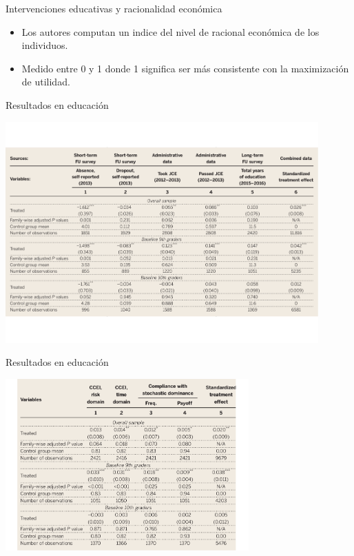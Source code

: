 \documentclass[11pt, aspectratio=169, compress]{beamer}
\begin{document}
\begin{frame}{Intervenciones educativas y racionalidad económica}
\begin{itemize}
	\item Los autores computan un indice del nivel de racional económica de los individuos. 
	\item Medido entre 0 y 1 donde 1 significa ser más consistente con la maximización de utilidad. 
\end{itemize}
\end{frame}
\begin{frame}{Resultados en educación}
\vspace*{-3em}
\begin{center}
	\includegraphics[width=0.9\textwidth]{tab1} 
\end{center}
\end{frame}
\begin{frame}{Resultados en educación}
	\begin{center}
		\includegraphics[width=0.7\textwidth]{tab2} 
	\end{center}
\end{frame}
\end{document}
